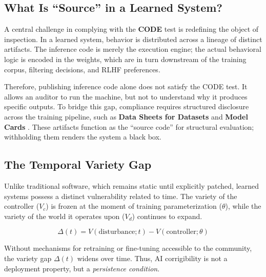 \subsection{What Is ``Source'' in a Learned System?}

A central challenge in complying with the \textbf{CODE} test is redefining the object of inspection. In a learned system, behavior is distributed across a lineage of distinct artifacts. The inference code is merely the execution engine; the actual behavioral logic is encoded in the weights, which are in turn downstream of the training corpus, filtering decisions, and RLHF preferences.

Therefore, publishing inference code alone does not satisfy the CODE test. It allows an auditor to run the machine, but not to understand why it produces specific outputs. To bridge this gap, compliance requires structured disclosure across the training pipeline, such as \textbf{Data Sheets for Datasets} \citep{gebru2021} and \textbf{Model Cards} \citep{mitchell2019}. These artifacts function as the ``source code'' for structural evaluation; withholding them renders the system a black box.

\subsection{The Temporal Variety Gap}

Unlike traditional software, which remains static until explicitly patched, learned systems possess a distinct vulnerability related to time. The variety of the controller ($V_c$) is frozen at the moment of training parameterization ($\theta$), while the variety of the world it operates upon ($V_d$) continues to expand.

\begin{equation}
\Delta(t) = V(\text{disturbance}; t) - V(\text{controller}; \theta)
\end{equation}

Without mechanisms for retraining or fine-tuning accessible to the community, the variety gap $\Delta(t)$ widens over time. Thus, AI corrigibility is not a deployment property, but a \textit{persistence condition}.


